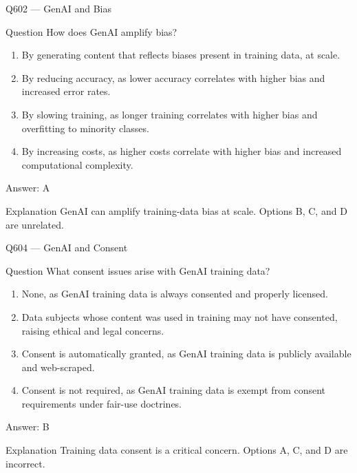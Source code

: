 \documentclass[aspectratio=169,8pt]{beamer}
\begin{document}
	\begin{frame}{Q602 --- GenAI and Bias}
		\begin{block}{Question}
			How does GenAI amplify bias?
			\begin{enumerate}
				\item By generating content that reflects biases present in training data, at scale.
				\item By reducing accuracy, as lower accuracy correlates with higher bias and increased error rates.
				\item By slowing training, as longer training correlates with higher bias and overfitting to minority classes.
				\item By increasing costs, as higher costs correlate with higher bias and increased computational complexity.
			\end{enumerate}
		\end{block}
		\begin{exampleblock}{Answer: A}\end{exampleblock}
		\begin{block}{Explanation}
			GenAI can amplify training-data bias at scale. Options B, C, and D are unrelated.
		\end{block}
	\end{frame}
	

	
	\begin{frame}{Q604 --- GenAI and Consent}
		\begin{block}{Question}
			What consent issues arise with GenAI training data?
			\begin{enumerate}
				\item None, as GenAI training data is always consented and properly licensed.
				\item Data subjects whose content was used in training may not have consented, raising ethical and legal concerns.
				\item Consent is automatically granted, as GenAI training data is publicly available and web-scraped.
				\item Consent is not required, as GenAI training data is exempt from consent requirements under fair-use doctrines.
			\end{enumerate}
		\end{block}
		\begin{exampleblock}{Answer: B}\end{exampleblock}
		\begin{block}{Explanation}
			Training data consent is a critical concern. Options A, C, and D are incorrect.
		\end{block}
	\end{frame}
	
\end{document}
